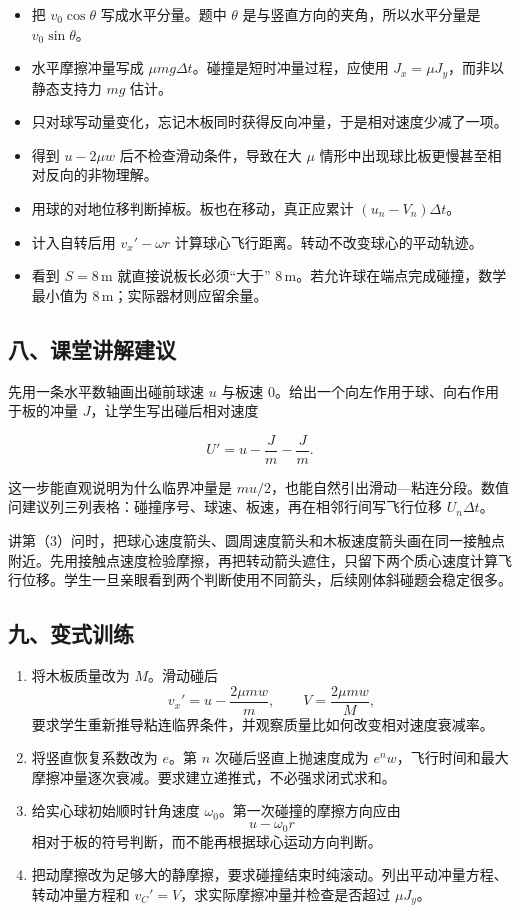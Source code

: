\documentclass[12pt,a4paper,UTF8]{ctexart}
\newcommand{\tightlist}{\setlength{\itemsep}{0pt}\setlength{\parskip}{0pt}}
\begin{document}
\begin{itemize}
\tightlist
\item
  把 \(v_0\cos\theta\) 写成水平分量。题中 \(\theta\)
  是与竖直方向的夹角，所以水平分量是 \(v_0\sin\theta\)。
\item
  水平摩擦冲量写成 \(\mu mg\Delta t\)。碰撞是短时冲量过程，应使用
  \(J_x=\mu J_y\)，而非以静态支持力 \(mg\) 估计。
\item
  只对球写动量变化，忘记木板同时获得反向冲量，于是相对速度少减了一项。
\item
  得到 \(u-2\mu w\) 后不检查滑动条件，导致在大 \(\mu\)
  情形中出现球比板更慢甚至相对反向的非物理解。
\item
  用球的对地位移判断掉板。板也在移动，真正应累计 \((u_n-V_n)\Delta t\)。
\item
  计入自转后用 \(v_x'-\omega r\)
  计算球心飞行距离。转动不改变球心的平动轨迹。
\item
  看到 \(S=8\,\mathrm m\) 就直接说板长必须``大于''
  \(8\,\mathrm m\)。若允许球在端点完成碰撞，数学最小值为
  \(8\,\mathrm m\)；实际器材则应留余量。
\end{itemize}

\subsection{八、课堂讲解建议}\label{ux516bux8bfeux5802ux8bb2ux89e3ux5efaux8bae-1}

先用一条水平数轴画出碰前球速 \(u\) 与板速
\(0\)。给出一个向左作用于球、向右作用于板的冲量
\(J\)，让学生写出碰后相对速度

\[U'=u-\frac Jm-\frac Jm.\]

这一步能直观说明为什么临界冲量是
\(mu/2\)，也能自然引出滑动---粘连分段。数值问建议列三列表格：碰撞序号、球速、板速，再在相邻行间写飞行位移
\(U_n\Delta t\)。

讲第（3）问时，把球心速度箭头、圆周速度箭头和木板速度箭头画在同一接触点附近。先用接触点速度检验摩擦，再把转动箭头遮住，只留下两个质心速度计算飞行位移。学生一旦亲眼看到两个判断使用不同箭头，后续刚体斜碰题会稳定很多。

\subsection{九、变式训练}\label{ux4e5dux53d8ux5f0fux8badux7ec3-1}

\begin{enumerate}
\def\labelenumi{\arabic{enumi}.}
\tightlist
\item
  将木板质量改为 \(M\)。滑动碰后
  \[v_x'=u-\frac{2\mu mw}{m},\qquad V=\frac{2\mu mw}{M},\]
  要求学生重新推导粘连临界条件，并观察质量比如何改变相对速度衰减率。
\item
  将竖直恢复系数改为 \(e\)。第 \(n\) 次碰后竖直上抛速度成为
  \(e^nw\)，飞行时间和最大摩擦冲量逐次衰减。要求建立递推式，不必强求闭式求和。
\item
  给实心球初始顺时针角速度 \(\omega_0\)。第一次碰撞的摩擦方向应由
  \[u-\omega_0r\] 相对于板的符号判断，而不能再根据球心运动方向判断。
\item
  把动摩擦改为足够大的静摩擦，要求碰撞结束时纯滚动。列出平动冲量方程、转动冲量方程和
  \(v_C'=V\)，求实际摩擦冲量并检查是否超过 \(\mu J_y\)。
\end{enumerate}
\end{document}
